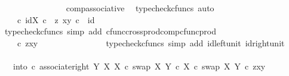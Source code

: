 \begin{isabellebody}
\ \ \ \ \ \ \ \ \ \ \ \ \ \ \isamarkupfalse%
\ comp{\isacharunderscore}{\kern0pt}associative{}\ \isamarkupfalse%
\ {\isacharparenleft}{\kern0pt}typecheck{\isacharunderscore}{\kern0pt}cfuncs{\isacharcomma}{\kern0pt}\ auto{\isacharparenright}{\kern0pt}\isanewline
\ \ \ \ \ \ \ \ \ \ \ \ \isamarkupfalse%
\ \isamarkupfalse%
\ {\isachardoublequoteopen}{\isachardot}{\kern0pt}{\isachardot}{\kern0pt}{\isachardot}{\kern0pt}\ {\isacharequal}{\kern0pt}\ {\isasymTheta}\isactrlsup {\isasymflat}\ {\isasymcirc}\isactrlsub c\ {\isasymlangle}id{\isacharparenleft}{\kern0pt}X{\isacharparenright}{\kern0pt}\ {\isasymcirc}\isactrlsub c\ \ z{\isacharcomma}{\kern0pt}\ {\isasymlangle}x{\isacharcomma}{\kern0pt}y{\isasymrangle}\ {\isasymcirc}\isactrlsub c\ \ id\ {\isasymone}{\isasymrangle}{\isachardoublequoteclose}\isanewline
\ \ \ \ \ \ \ \ \ \ \ \ \ \ \isamarkupfalse%
\ {\isacharparenleft}{\kern0pt}typecheck{\isacharunderscore}{\kern0pt}cfuncs{\isacharcomma}{\kern0pt}\ simp\ add{\isacharcolon}{\kern0pt}\ cfunc{\isacharunderscore}{\kern0pt}cross{\isacharunderscore}{\kern0pt}prod{\isacharunderscore}{\kern0pt}comp{\isacharunderscore}{\kern0pt}cfunc{\isacharunderscore}{\kern0pt}prod{\isacharparenright}{\kern0pt}\isanewline
\ \ \ \ \ \ \ \ \ \ \ \ \isamarkupfalse%
\ \isamarkupfalse%
\ {\isachardoublequoteopen}{\isachardot}{\kern0pt}{\isachardot}{\kern0pt}{\isachardot}{\kern0pt}\ {\isacharequal}{\kern0pt}\ {\isasymTheta}\isactrlsup {\isasymflat}\ {\isasymcirc}\isactrlsub c\ {\isasymlangle}z{\isacharcomma}{\kern0pt}{\isasymlangle}x{\isacharcomma}{\kern0pt}y{\isasymrangle}{\isasymrangle}{\isachardoublequoteclose}\isanewline
\ \ \ \ \ \ \ \ \ \ \ \ \ \ \isamarkupfalse%
\ {\isacharparenleft}{\kern0pt}typecheck{\isacharunderscore}{\kern0pt}cfuncs{\isacharcomma}{\kern0pt}\ simp\ add{\isacharcolon}{\kern0pt}\ id{\isacharunderscore}{\kern0pt}left{\isacharunderscore}{\kern0pt}unit{}\ id{\isacharunderscore}{\kern0pt}right{\isacharunderscore}{\kern0pt}unit{}{\isacharparenright}{\kern0pt}\isanewline
\ \ \ \ \ \ \ \ \ \ \ \ \isamarkupfalse%
\ \isamarkupfalse%
\ {\isachardoublequoteopen}{\isachardot}{\kern0pt}{\isachardot}{\kern0pt}{\isachardot}{\kern0pt}\ {\isacharequal}{\kern0pt}\ {\isacharparenleft}{\kern0pt}{\isacharparenleft}{\kern0pt}into\ {\isasymcirc}\isactrlsub c\ associate{\isacharunderscore}{\kern0pt}right\ Y\ X\ X\ {\isasymcirc}\isactrlsub c\ swap\ X\ {\isacharparenleft}{\kern0pt}Y\ {\isasymtimes}\isactrlsub c\ X{\isacharparenright}{\kern0pt}{\isacharparenright}{\kern0pt}\isactrlsup {\isasymsharp}\ {\isasymcirc}\isactrlsub c\ swap\ X\ Y{\isacharparenright}{\kern0pt}\isactrlsup {\isasymflat}\ {\isasymcirc}\isactrlsub c\ {\isasymlangle}z{\isacharcomma}{\kern0pt}{\isasymlangle}x{\isacharcomma}{\kern0pt}y{\isasymrangle}{\isasymrangle}{\isachardoublequoteclose}\isanewline

\end{isabellebody}
